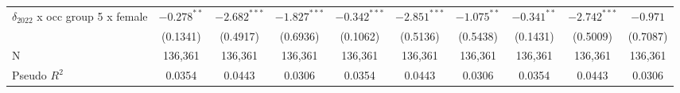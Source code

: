 \begin{tabular}{l|ccc|ccc|ccc|}
$\delta_{2022}$ x occ group 5 x female &           $-0.278^{**}$ &  $-2.682^{***}$ &  $-1.827^{***}$ &           $-0.342^{***}$ &  $-2.851^{***}$ &   $-1.075^{**}$ &            $-0.341^{**}$ &  $-2.742^{***}$ &        $-0.971$ \\
                                       &                (0.1341) &        (0.4917) &        (0.6936) &                 (0.1062) &        (0.5136) &        (0.5438) &                 (0.1431) &        (0.5009) &        (0.7087) \\
N                                      &                 136,361 &         136,361 &         136,361 &                  136,361 &         136,361 &         136,361 &                  136,361 &         136,361 &         136,361 \\
Pseudo $R^2$                           &                  0.0354 &          0.0443 &          0.0306 &                   0.0354 &          0.0443 &          0.0306 &                   0.0354 &          0.0443 &          0.0306 \\
\bottomrule
\end{tabular}
